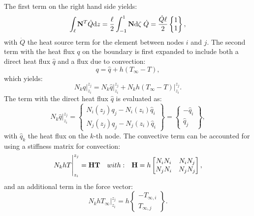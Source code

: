 \documentclass[10pt, a4paper, twoside, headinclude,footinclude, BCOR5mm]{scrartcl}
\begin{document}
The first term on the right hand side yields:
\begin{equation*}
  \int_\ell \bold{N}^T \dot{Q} \text{d}z =
  \frac{\ell}{2} \int_{-1}^{1} \bold{N} \text{d}\zeta \; \dot{Q} = \frac{ \dot{Q} \ell}{2} \begin{Bmatrix} 1 \\ 1 \end{Bmatrix},
\end{equation*}
with \(\dot{Q}\) the heat source term for the element between nodes \(i\) and \(j\). The second term with the heat flux \(q\) on the boundary is first expanded to include both a direct heat flux \(\hat{q}\) and a flux due to convection:
\begin{equation*}
  q = \hat{q} + h(T_{\infty}-T),
\end{equation*}
which yields:
\begin{equation*}
  N_k q \Biggr|_{z_i}^{z_j} = N_k \hat{q} \Biggr|_{z_i}^{z_j} +
                             N_k h (T_{\infty}-T) \Biggr|_{z_i}^{z_j}.
\end{equation*}
The term with the direct heat flux \(\hat{q}\) is evaluated as:
\begin{equation*}
  N_k \hat{q} \Biggr|_{z_i}^{z_j} =
     \begin{Bmatrix} N_i(z_j)q_j - N_i(z_i) \hat{q}_i \\
                     N_j(z_j)q_j - N_j(z_i) \hat{q}_i \end{Bmatrix} =
     \begin{Bmatrix} - \hat{q}_i \\
                       \hat{q}_j \end{Bmatrix},
\end{equation*}
with \(\hat{q}_k\) the heat flux on the \(k\)-th node. The convective term can be accounted for using a stiffness matrix for convection:
\begin{equation}
\label{eq:H}
  N_k h T \Biggr|_{z_i}^{z_j} = \bold{H} \bold{T} \quad{with:}\quad
      \bold{H} = h\left[\begin{matrix} N_i N_i & N_i N_j \\
                                       N_j N_i & N_j N_j \end{matrix}\right],
\end{equation}
and an additional term in the force vector:
\begin{equation*}
  N_k h T_{\infty} \Biggr|_{z_i}^{z_j} =
     h\begin{Bmatrix} - T_{\infty,i} \\
                        T_{\infty,j} \end{Bmatrix}.
\end{equation*}
\end{document}
